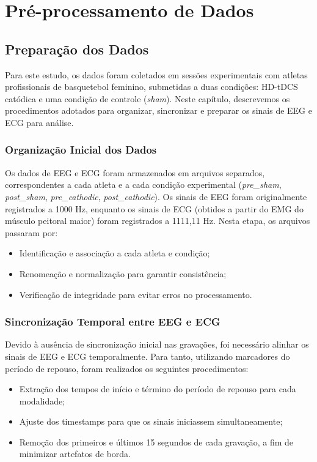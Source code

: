 \chapter{Pré-processamento de Dados}
\label{chap:preprocessamento_de_dados}
\section{Preparação dos Dados}
Para este estudo, os dados foram coletados em sessões experimentais com atletas profissionais de basquetebol feminino, submetidas a duas condições: HD-tDCS catódica e uma condição de controle (\textit{sham}). Neste capítulo, descrevemos os procedimentos adotados para organizar, sincronizar e preparar os sinais de EEG e ECG para análise.

\subsection{Organização Inicial dos Dados}
Os dados de EEG e ECG foram armazenados em arquivos separados, correspondentes a cada atleta e a cada condição experimental (\textit{pre\_\textit{sham}}, \textit{post\_\textit{sham}}, \textit{pre\_cathodic}, \textit{post\_cathodic}). Os sinais de EEG foram originalmente registrados a 1000 Hz, enquanto os sinais de ECG (obtidos a partir do EMG do músculo peitoral maior) foram registrados a 1111,11 Hz. Nesta etapa, os arquivos passaram por:
\begin{itemize}
    \item Identificação e associação a cada atleta e condição;
    \item Renomeação e normalização para garantir consistência;
    \item Verificação de integridade para evitar erros no processamento.
\end{itemize}

\subsection{Sincronização Temporal entre EEG e ECG}
Devido à ausência de sincronização inicial nas gravações, foi necessário alinhar os sinais de EEG e ECG temporalmente. Para tanto, utilizando marcadores do período de repouso, foram realizados os seguintes procedimentos:
\begin{itemize}
    \item Extração dos tempos de início e término do período de repouso para cada modalidade;
    \item Ajuste dos timestamps para que os sinais iniciassem simultaneamente;
    \item Remoção dos primeiros e últimos 15 segundos de cada gravação, a fim de minimizar artefatos de borda.
\end{itemize}

